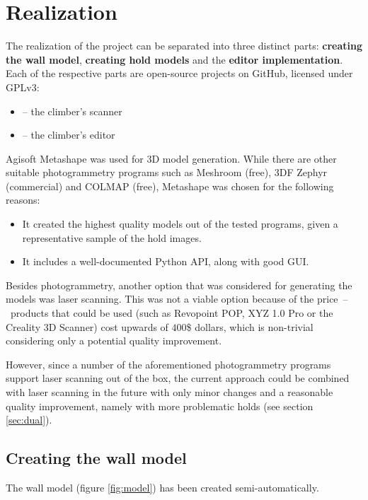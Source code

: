 \chapter{Realization}\label{sec:realization}

The realization of the project can be separated into three distinct parts: \textbf{creating the wall model}, \textbf{creating hold models} and the \textbf{editor implementation}.
Each of the respective parts are open-source projects on GitHub, licensed under GPLv3:
\begin{itemize}
	\item \raisebox{-0.08em}{} -- the climber's scanner \cite{clis}
	\item \raisebox{-0.08em}{} -- the climber's editor \cite{cled}
\end{itemize}

Agisoft Metashape was used for 3D model generation.
While there are other suitable photogrammetry programs such as Meshroom (free), 3DF Zephyr (commercial) and COLMAP (free), Metashape was chosen for the following reasons:
\begin{itemize}
	\item It created the highest quality models out of the tested programs, given a representative sample of the hold images.
	\item It includes a well-documented Python API, along with good GUI.
\end{itemize}

Besides photogrammetry, another option that was considered for generating the models was laser scanning.
This was not a viable option because of the price~--~products that could be used (such as Revopoint POP, XYZ 1.0 Pro or the Creality 3D Scanner) cost upwards of $400$\$ dollars, which is non-trivial considering only a potential quality improvement.

However, since a number of the aforementioned photogrammetry programs support laser scanning out of the box, the current approach could be combined with laser scanning in the future with only minor changes and a reasonable quality improvement, namely with more problematic holds (see section \ref{sec:dual}).

\section{Creating the wall model}
The wall model (figure \ref{fig:model}) has been created semi-automatically.

